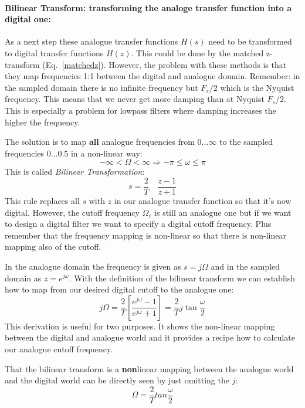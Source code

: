 \documentclass[12pt,a4paper]{article}
\begin{document}
\paragraph{Bilinear Transform: transforming the analoge transfer function into a digital one:}
As a next step these analogue transfer functions $H(s)$ need to be
transformed to digital transfer functions $H(z)$. This could be done
by the matched z-transform
(Eq.~\ref{matchedz}). However, the problem with these methods is that
they map frequencies 1:1 between the digital and analogue
domain. Remember: in the sampled domain there is no infinite frequency
but $F_s/2$ which is the Nyquist frequency.  This means that we never
get more damping than at Nyquist $F_s/2$.  This is especially a
problem for lowpass filters where damping increases the higher the
frequency.

The solution is to map {\bf all} analogue frequencies from $0 \ldots \infty$
to the sampled frequencies $0\ldots 0.5$ in a non-linear way:
\begin{equation} 
- \infty < \Omega < \infty \Rightarrow -\pi \leq \omega \leq \pi 
\end{equation}
This is called \textsl{Bilinear Transformation}:
\begin{equation} 
s = \frac{2}{T} \quad \frac{z - 1}{z + 1}
\end{equation}
This rule replaces all $s$ with $z$ in our analogue transfer
function so that it's now digital. However, the cutoff frequency $\Omega_c$
is still an analogue one but if we want to design a digital filter
we want to specify a digital cutoff frequency. Plus remember that
the frequency mapping is non-linear so that there is non-linear
mapping also of the cutoff. 

In the analogue domain the
frequency is given as $s = j\Omega$ and in the sampled domain as
$z = e^{j \omega}$. With the definition of the bilinear transform
we can establish how to map from our desired digital cutoff to
the analogue one:
\begin{equation} 
j \Omega = \frac{2}{T} \left[\frac{e^{j \omega} - 1}{e^{j \omega} +1}\right] = \frac{2}{T} j \tan \frac{\omega}{2}
\end{equation}
This derivation is useful for two purposes. It shows the non-linear
mapping between the digital and analogue world and it provides
a recipe how to calculate our analogue cutoff frequency.

That the bilinear transform is a 
{\bf non}linear mapping between the analogue world and the digital
world can be directly seen by just omitting the $j$:
\begin{equation}
\Omega = \frac{2}{T} tan \frac{\omega}{2}
\end{equation}
\end{document}

